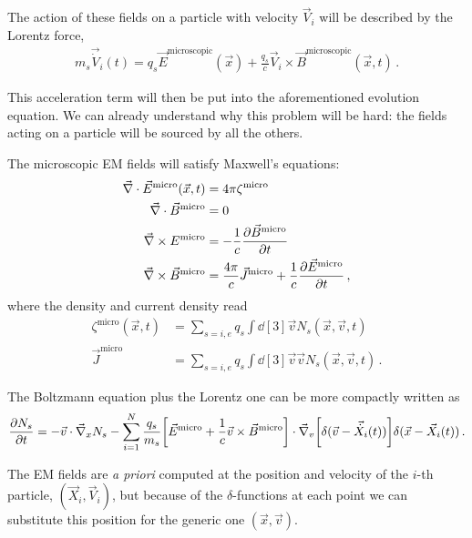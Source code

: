 \documentclass[main.tex]{subfiles}
\begin{document}
The action of these fields on a particle with velocity \(\vec{V}_i\) will be described by the Lorentz force, 
%
\begin{align}
m_s \vec{\dot{V}}_i (t) = q_s \vec{E}^{\text{microscopic}} (\vec{x}) + \frac{q_s}{c} \vec{V}_i \times \vec{B}^{\text{microscopic}} (\vec{x}, t)
\,.
\end{align}

This acceleration term will then be put into the aforementioned evolution equation. 
We can already understand why this problem will be hard: the fields acting on a particle will be sourced by all the others. 

The microscopic EM fields will satisfy Maxwell's equations: 
%
\begin{align}
\vec{\nabla} \cdot \vec{E}^{\text{micro}} (\vec{x}, t) 
&= 4 \pi \zeta^{\text{micro}}  \\
\vec{\nabla} \cdot \vec{B}^{\text{micro}} &= 0  \\
\vec{\nabla} \times E^{\text{micro}} &= - \frac{1}{c} \pdv{\vec{B}^{\text{micro}}}{t}  \\
\vec{\nabla} \times \vec{B}^{\text{micro}} &= \frac{4 \pi }{c} \vec{J}^{\text{micro}} + \frac{1}{c} \pdv{\vec{E}^{\text{micro}}}{t} 
\,,
\end{align}
%
where the density and current density read 
%
\begin{align}
\zeta^{\text{micro}} (\vec{x}, t) &= \sum _{s=i, e} q_s 
\int \dd[3]{\vec{v}} N_s (\vec{x}, \vec{v}, t)  \\
\vec{J}^{\text{micro}} &= \sum _{s=i, e} q_s 
\int \dd[3]{\vec{v}} \vec{v} N_s (\vec{x}, \vec{v}, t)
\,.
\end{align}

The Boltzmann equation plus the Lorentz one can be more compactly written as 
%
\begin{align}
\pdv{N_s}{t} 
= - \vec{v} \cdot \vec{\nabla}_x N_s 
- \sum _{i=1}^{N} \frac{q_s}{m_s} 
\qty[ \vec{E}^{\text{micro}} + \frac{1}{c} \vec{v} \times \vec{B}^{\text{micro}}] \cdot \vec{\nabla}_v \qty[
    \delta (\vec{v} - \vec{\dot{X}}_i(t))
    ]
\delta (\vec{x} - \vec{X}_i(t)) 
\,.
\end{align}

The EM fields are \emph{a priori} computed at the position and velocity of the \(i\)-th particle, \((\vec{X}_i, \vec{V}_i)\), but because of the \(\delta \)-functions at each point we can substitute this position for the generic one \((\vec{x}, \vec{v})\). 

\end{document}

